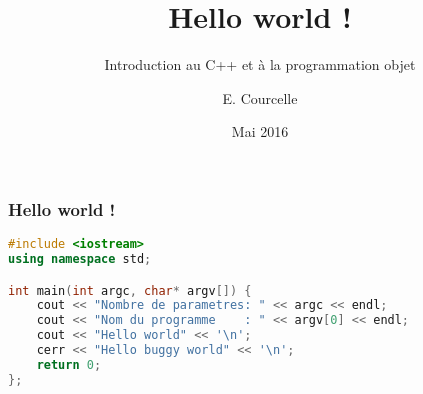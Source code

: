 \documentclass{beamer}
\title{Hello world !}
\subtitle{Introduction au C++ et à la programmation objet}
\author{E. Courcelle}\institute{CALMIP, UMS 3669}
\date{Mai 2016}
\begin{document}
\begin{frame}
\titlepage
\end{frame}

\begin{frame}[fragile=singleslide,shrink=20]
\frametitle {Hello world !}
\begin{lstlisting}[language=c++]
#include <iostream>
using namespace std;

int main(int argc, char* argv[]) {
    cout << "Nombre de parametres: " << argc << endl;
    cout << "Nom du programme    : " << argv[0] << endl;
    cout << "Hello world" << '\n';
    cerr << "Hello buggy world" << '\n';
    return 0;
};
\end{lstlisting}
\end{frame}
\end{document}
